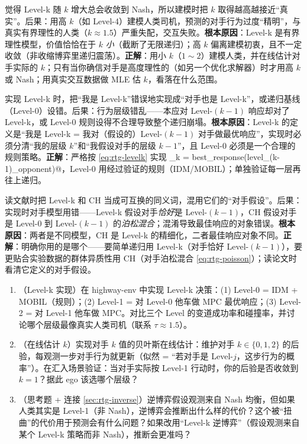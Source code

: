 \begin{pitfall}
觉得 Level-k 随 $k$ 增大总会收敛到 Nash，所以建模时把 $k$ 取得越高越接近“真实”。后果：用高 $k$（如 Level-4）建模人类司机，预测的对手行为过度“精明”，与真实有界理性的人类（$k\approx1.5$）严重失配，交互失败。\textbf{根本原因}：Level-k 是有界理性模型，价值恰恰在于 $k$ \emph{小}（截断了无限递归）；高 $k$ 偏离建模初衷，且不一定收敛（非收缩博弈里递归震荡）。\textbf{正解}：用小 $k$（$1\sim2$）建模人类，并在线估计对手实际的 $k$；只有当你确信对手是高度理性的（如另一个优化求解器）时才用高 $k$ 或 Nash；用真实交互数据做 MLE 估 $k$，看落在什么范围。
\end{pitfall}

\begin{pitfall}
实现 Level-k 时，把“我是 Level-k”错误地实现成“对手也是 Level-k”，或递归基线（Level-0）设错。后果：行为层级错乱——本应对 Level-$(k-1)$ 响应却对了 Level-k，或 Level-0 规则设得不合理导致整个递归崩塌。\textbf{根本原因}：Level-k 的定义是“我是 Level-k = 我对（假设的）Level-$(k-1)$ 对手做最优响应”，实现时必须分清“我的层级 $k$”和“我假设对手的层级 $k-1$”，且 Level-0 必须是一个合理的规则策略。\textbf{正解}：严格按 \cref{eq:rtg-levelk} 实现 \verb@level_k = best_response(level_(k-1)_opponent)@，Level-0 用经过验证的规则（IDM/MOBIL）；单独验证每一层再往上递归。
\end{pitfall}

\begin{pitfall}
读文献时把 Level-k 和 CH 当成可互换的同义词，混用它们的“对手假设”。后果：实现时对手模型用错——Level-k 假设对手\emph{恰好}是 Level-$(k-1)$，CH 假设对手是 Level-0 到 Level-$(k-1)$ 的\emph{泊松混合}；混淆导致最佳响应的对象错误。\textbf{根本原因}：两者是不同模型，CH 是 Level-k 的精细化，二者最佳响应对象不同。\textbf{正解}：明确你用的是哪个——要简单递归用 Level-k（对手恰好 Level-$(k-1)$），要更贴合实验数据的群体异质性用 CH（对手泊松混合 \cref{eq:rtg-poisson}）；读论文时看清它定义的对手假设。
\end{pitfall}

\begin{practice}
\begin{enumerate}
  \item （Level-k 实现）在 highway-env 中实现 Level-k 决策：(1) Level-0 = IDM + MOBIL（规则）；(2) Level-1 = 对 Level-0 他车做 MPC 最优响应；(3) Level-2 = 对 Level-1 他车做 MPC。对比三个 Level 的变道成功率和碰撞率，并讨论哪个层级最像真实人类司机（联系 $\tau\approx1.5$）。
  \item （在线估计 $k$）实现对手 $k$ 值的贝叶斯在线估计：维护对手 $k\in\{0,1,2\}$ 的后验，每观测一步对手行为就更新（似然 = “若对手是 Level-$j$，这步行为的概率”）。在汇入场景验证：当对手实际按 Level-1 行动时，你的后验是否收敛到 $k=1$？据此 ego 该选哪个层级？
  \item （思考题 + 连接 \cref{sec:rtg-inverse}）逆博弈假设观测来自 Nash 均衡，但如果人类其实是 Level-1（非 Nash），逆博弈会推断出什么样的代价？这个被“扭曲”的代价用于预测会有什么问题？如果改用“Level-k 逆博弈”（假设观测来自某个 Level-k 策略而非 Nash），推断会更准吗？
\end{enumerate}
\end{practice}

